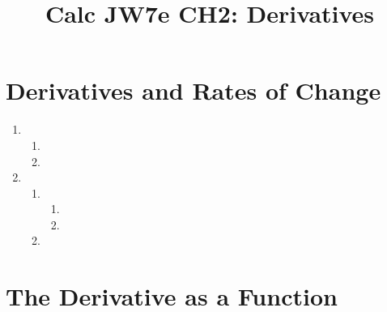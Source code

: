 \documentclass[12pt, letterpaper]{report}
\title{Calc JW7e CH2: Derivatives}
\date{}
\author{}
\begin{document}
\maketitle
\setcounter{chapter}{2}
\section{Derivatives and Rates of Change}
\begin{enumerate}[]
      \item
            \begin{enumerate}[label=(\alph*),leftmargin=\parindent]
                  \item
                  \item
            \end{enumerate}

      \item
            \begin{enumerate}[label=(\alph*),leftmargin=\parindent]
                  \item
                        \begin{enumerate}[label=(\roman*)]
                              \item
                              \item
                        \end{enumerate}
                  \item
            \end{enumerate}
\end{enumerate}
\section{The Derivative as a Function}
\end{document}
